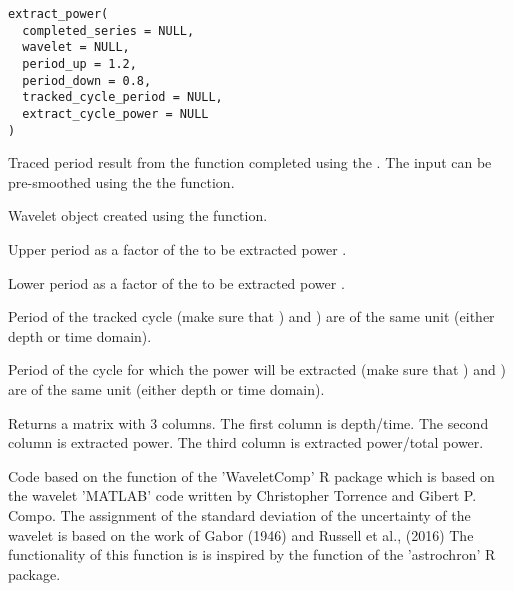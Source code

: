 \documentclass[a4paper]{book}
\begin{document}
%
\begin{Usage}
\begin{verbatim}
extract_power(
  completed_series = NULL,
  wavelet = NULL,
  period_up = 1.2,
  period_down = 0.8,
  tracked_cycle_period = NULL,
  extract_cycle_power = NULL
)
\end{verbatim}
\end{Usage}
%
\begin{Arguments}
\begin{ldescription}
\item[\code{completed\_series}] Traced period result from the 
function completed using the .
The input can be pre-smoothed using the the  function.

\item[\code{wavelet}] Wavelet object created using the  function.

\item[\code{period\_up}] Upper period as a factor of the to be extracted power .

\item[\code{period\_down}] Lower period as a factor of the to be extracted power .

\item[\code{tracked\_cycle\_period}] Period of the tracked cycle (make sure that
) and ) are of the same
unit (either depth or time domain).

\item[\code{extract\_cycle\_power}] Period of the cycle for which the power will be
extracted (make sure that ) and
) are of the same unit (either depth or time domain).
\end{ldescription}
\end{Arguments}
%
\begin{Value}
Returns a matrix with 3 columns.
The first column is depth/time.
The second column is extracted power.
The third column is extracted power/total power.
\end{Value}
%
\begin{Author}
Code based on the  function of the 'WaveletComp' R package
which is based on the wavelet 'MATLAB' code written by Christopher Torrence and Gibert P. Compo.
The assignment of the standard deviation of the uncertainty of the wavelet
is based on the work of Gabor (1946) and Russell et al., (2016)
The functionality of this function is is inspired by the
 function of the 'astrochron' R package.
\end{Author}
\end{document}
